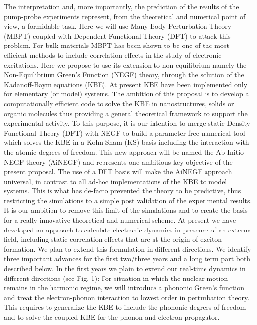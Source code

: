 The interpretation and, more importantly, the prediction of the results of the pump-probe  experiments represent, from the theoretical and numerical point of view, a formidable task. Here we will use Many-Body Perturbation Theory (MBPT) coupled with Dependent Functional Theory (DFT) to attack this problem.  For bulk materials MBPT has been shown to be one of the most efficient methods to include correlation effects in the study of electronic excitations.  Here we propose to use its extension to non equilibrium namely the Non-Equilibrium Green's Function (NEGF) theory, through the solution of the Kadanoff-Baym equations (KBE).  At present  KBE have been implemented only for elementary (or model) systems. The ambition of this proposal is to develop a computationally efficient code to solve the KBE in nanostructures, solids or organic molecules thus providing a general theoretical framework to support the experimental activity.
To this purpose, it is our intention to merge static Density-Functional-Theory (DFT) with NEGF to build a parameter free numerical tool which solves the KBE in a Kohn-Sham (KS) basis including the interaction with the atomic degrees of freedom. This new approach will be named the Ab-Initio NEGF theory (AiNEGF) and represents one ambitious key objective of the present proposal. The use of a DFT basis will make the AiNEGF approach universal, in contrast to all ad-hoc implementations of the KBE to model systems. This is what has de-facto prevented the theory to be predictive, thus restricting the simulations to a simple post validation of the experimental results. It is our ambition to remove this limit of the simulations and to create the basis for a really innovative theoretical and numerical scheme.
At present we have developed an approach to calculate electronic dynamics in presence of an external field, including static correlation effects that are at the origin of exciton formation. We plan to extend this formulation in different directions. We identify three important advances for the first two/three years and a long term part both described below.
In the first years we plain to extend our real-time dynamics in different directions (see Fig. 1):
For situation in which the nuclear motion remains in the harmonic regime, we will introduce a phononic Green's function and treat the electron-phonon interaction to lowest order in perturbation theory. This requires to generalize the KBE to include the phononic degrees of freedom and to solve the coupled KBE for the phonon and electron propagator.

